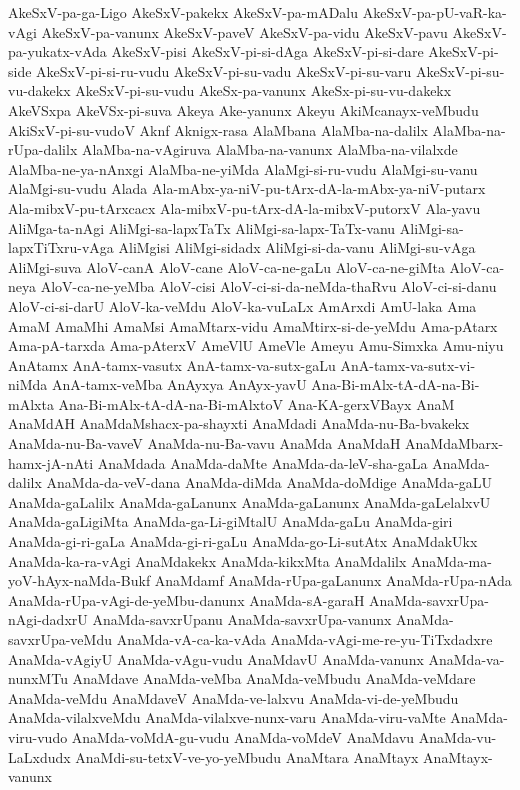 {AkeSxV-pa-ga-Ligo
AkeSxV-pakekx
AkeSxV-pa-mADalu
AkeSxV-pa-pU-vaR-ka-vAgi
AkeSxV-pa-vanunx
AkeSxV-paveV
AkeSxV-pa-vidu
AkeSxV-pavu
AkeSxV-pa-yukatx-vAda
AkeSxV-pisi
AkeSxV-pi-si-dAga
AkeSxV-pi-si-dare
AkeSxV-pi-side
AkeSxV-pi-si-ru-vudu
AkeSxV-pi-su-vadu
AkeSxV-pi-su-varu
AkeSxV-pi-su-vu-dakekx
AkeSxV-pi-su-vudu
AkeSx-pa-vanunx
AkeSx-pi-su-vu-dakekx
AkeVSxpa
AkeVSx-pi-suva
Akeya
Ake-yanunx
Akeyu
AkiMcanayx-veMbudu
AkiSxV-pi-su-vudoV
Aknf
Aknigx-rasa
AlaMbana
AlaMba-na-dalilx
AlaMba-na-rUpa-dalilx
AlaMba-na-vAgiruva
AlaMba-na-vanunx
AlaMba-na-vilalxde
AlaMba-ne-ya-nAnxgi
AlaMba-ne-yiMda
AlaMgi-si-ru-vudu
AlaMgi-su-vanu
AlaMgi-su-vudu
Alada
Ala-mAbx-ya-niV-pu-tArx-dA-la-mAbx-ya-niV-putarx
Ala-mibxV-pu-tArxcacx
Ala-mibxV-pu-tArx-dA-la-mibxV-putorxV
Ala-yavu
AliMga-ta-nAgi
AliMgi-sa-lapxTaTx
AliMgi-sa-lapx-TaTx-vanu
AliMgi-sa-lapxTiTxru-vAga
AliMgisi
AliMgi-sidadx
AliMgi-si-da-vanu
AliMgi-su-vAga
AliMgi-suva
AloV-canA
AloV-cane
AloV-ca-ne-gaLu
AloV-ca-ne-giMta
AloV-ca-neya
AloV-ca-ne-yeMba
AloV-cisi
AloV-ci-si-da-neMda-thaRvu
AloV-ci-si-danu
AloV-ci-si-darU
AloV-ka-veMdu
AloV-ka-vuLaLx
AmArxdi
AmU-laka
Ama
AmaM
AmaMhi
AmaMsi
AmaMtarx-vidu
AmaMtirx-si-de-yeMdu
Ama-pAtarx
Ama-pA-tarxda
Ama-pAterxV
AmeVlU
AmeVle
Ameyu
Amu-Simxka
Amu-niyu
AnAtamx
AnA-tamx-vasutx
AnA-tamx-va-sutx-gaLu
AnA-tamx-va-sutx-vi-niMda
AnA-tamx-veMba
AnAyxya
AnAyx-yavU
Ana-Bi-mAlx-tA-dA-na-Bi-mAlxta
Ana-Bi-mAlx-tA-dA-na-Bi-mAlxtoV
Ana-KA-gerxVBayx
AnaM
AnaMdAH
AnaMdaMshacx-pa-shayxti
AnaMdadi
AnaMda-nu-Ba-bvakekx
AnaMda-nu-Ba-vaveV
AnaMda-nu-Ba-vavu
AnaMda
AnaMdaH
AnaMdaMbarx-hamx-jA-nAti
AnaMdada
AnaMda-daMte
AnaMda-da-leV-sha-gaLa
AnaMda-dalilx
AnaMda-da-veV-dana
AnaMda-diMda
AnaMda-doMdige
AnaMda-gaLU
AnaMda-gaLalilx
AnaMda-gaLanunx
AnaMda-gaLanunx
AnaMda-gaLelalxvU
AnaMda-gaLigiMta
AnaMda-ga-Li-giMtalU
AnaMda-gaLu
AnaMda-giri
AnaMda-gi-ri-gaLa
AnaMda-gi-ri-gaLu
AnaMda-go-Li-sutAtx
AnaMdakUkx
AnaMda-ka-ra-vAgi
AnaMdakekx
AnaMda-kikxMta
AnaMdalilx
AnaMda-ma-yoV-hAyx-naMda-Bukf
AnaMdamf
AnaMda-rUpa-gaLanunx
AnaMda-rUpa-nAda
AnaMda-rUpa-vAgi-de-yeMbu-danunx
AnaMda-sA-garaH
AnaMda-savxrUpa-nAgi-dadxrU
AnaMda-savxrUpanu
AnaMda-savxrUpa-vanunx
AnaMda-savxrUpa-veMdu
AnaMda-vA-ca-ka-vAda
AnaMda-vAgi-me-re-yu-TiTxdadxre
AnaMda-vAgiyU
AnaMda-vAgu-vudu
AnaMdavU
AnaMda-vanunx
AnaMda-va-nunxMTu
AnaMdave
AnaMda-veMba
AnaMda-veMbudu
AnaMda-veMdare
AnaMda-veMdu
AnaMdaveV
AnaMda-ve-lalxvu
AnaMda-vi-de-yeMbudu
AnaMda-vilalxveMdu
AnaMda-vilalxve-nunx-varu
AnaMda-viru-vaMte
AnaMda-viru-vudo
AnaMda-voMdA-gu-vudu
AnaMda-voMdeV
AnaMdavu
AnaMda-vu-LaLxdudx
AnaMdi-su-tetxV-ve-yo-yeMbudu
AnaMtara
AnaMtayx
AnaMtayx-vanunx
}
